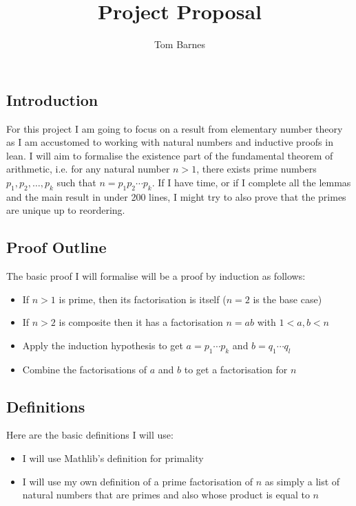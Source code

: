 \documentclass{article}
\begin{document}
\title{Project Proposal}

\author{Tom Barnes}

\maketitle              %

\subsection{Introduction}
For this project I am going to focus on a result from elementary number theory
as I am accustomed to working with natural numbers and inductive proofs in lean. 
I will aim to formalise the existence part of the fundamental theorem of arithmetic, 
i.e. for any natural number $n > 1$, there exists prime numbers $p_1, p_2, \dots ,p_k$ such
that $n=p_1p_2\cdots p_k$. If I have time, or if I complete all the lemmas and the main result
in under 200 lines, I might try to also prove that the primes are unique up to reordering.

\subsection{Proof Outline}
The basic proof I will formalise will be a proof by induction as follows:
\begin{itemize}
  \item If $n>1$ is prime, then its factorisation is itself ($n=2$ is the base case)
  \item If $n>2$ is composite then it has a factorisation $n=ab$ with $1<a,b<n$ 
  \item Apply the induction hypothesis to get $a=p_1 \cdots p_k$ and $b = q_1 \cdots q_l$
  \item Combine the factorisations of $a$ and $b$ to get a factorisation for $n$
\end{itemize}

\subsection{Definitions}
Here are the basic definitions I will use:
\begin{itemize}
  \item I will use Mathlib's definition for primality
  \item I will use my own definition of a prime factorisation of $n$ as simply a list of 
  natural numbers that are primes and also whose product is equal to $n$
\end{itemize}
\end{document}
